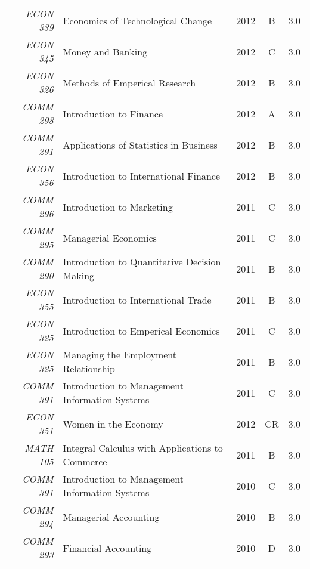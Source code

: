 \documentclass[11pt, a4paper]{awesome-cv}
\begin{document}
\begin{cvletter}
\begin{tabularx}{\linewidth}{ r|Xccc }
\textit{ECON 339} & \large Economics of Technological Change  &  2012 & B & 3.0 \\

\textit{ECON 345} & \large Money and Banking  &  2012 & C & 3.0 \\
\textit{ECON 326} & \large Methods of Emperical Research  &  2012 & B & 3.0 \\
\textit{COMM 298} & \large Introduction to Finance  &  2012 & A & 3.0 \\
 \textit{COMM 291} & \large Applications of Statistics in Business  &  2012 & B & 3.0 \\
\textit{ECON 356} & \large Introduction to International Finance  &  2012 & B & 3.0 \\
\textit{COMM 296} & \large Introduction to Marketing  &  2011 & C & 3.0 \\
\textit{COMM 295} & \large Managerial Economics  &  2011 & C & 3.0 \\
\textit{COMM 290} & \large Introduction to Quantitative Decision Making  &  2011 & B & 3.0 \\

\textit{ECON 355} & \large Introduction to International Trade  &  2011 & B & 3.0 \\
\textit{ECON 325} & \large Introduction to Emperical Economics  &  2011 & C & 3.0 \\
\textit{ECON 325} & \large Managing the Employment Relationship  &  2011 & B & 3.0 \\
 \textit{COMM 391} & \large Introduction to Management Information Systems  &  2011 & C & 3.0 \\
\textit{ECON 351} & \large Women in the Economy &  2012 & CR & 3.0 \\


 \textit{MATH 105} & \large Integral Calculus with Applications to Commerce & 2011 & B & 3.0\\
\textit{COMM 391} & \large Introduction to Management Information Systems  &  2010 & C & 3.0 \\
\textit{COMM 294} & \large Managerial Accounting  &  2010 & B & 3.0 \\

\textit{COMM 293} & \large Financial Accounting  &  2010 & D & 3.0 \\


\end{tabularx}
\end{cvletter}
\end{document}
